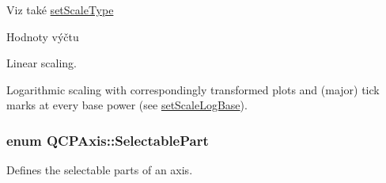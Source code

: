 \begin{DoxySeeAlso}{Viz také}
\hyperlink{classQCPAxis_adef29cae617af4f519f6c40d1a866ca6}{set\+Scale\+Type} 
\end{DoxySeeAlso}
\begin{Desc}
\item[Hodnoty výčtu]\par
\begin{description}
\item[{\em 
\hypertarget{classQCPAxis_a36d8e8658dbaa179bf2aeb973db2d6f0aff6e30a11a828bc850caffab0ff994f6}{}st\+Linear\label{classQCPAxis_a36d8e8658dbaa179bf2aeb973db2d6f0aff6e30a11a828bc850caffab0ff994f6}
}]Linear scaling. \item[{\em 
\hypertarget{classQCPAxis_a36d8e8658dbaa179bf2aeb973db2d6f0abf5b785ad976618816dc6f79b73216d4}{}st\+Logarithmic\label{classQCPAxis_a36d8e8658dbaa179bf2aeb973db2d6f0abf5b785ad976618816dc6f79b73216d4}
}]Logarithmic scaling with correspondingly transformed plots and (major) tick marks at every base power (see \hyperlink{classQCPAxis_a726186054be90487885a748aa1b42188}{set\+Scale\+Log\+Base}). \end{description}
\end{Desc}
\hypertarget{classQCPAxis_abee4c7a54c468b1385dfce2c898b115f}{}
\subsubsection[{Selectable\+Part}]{\setlength{\rightskip}{0pt plus 5cm}enum {\bf Q\+C\+P\+Axis\+::\+Selectable\+Part}}\label{classQCPAxis_abee4c7a54c468b1385dfce2c898b115f}


Defines the selectable parts of an axis. 

